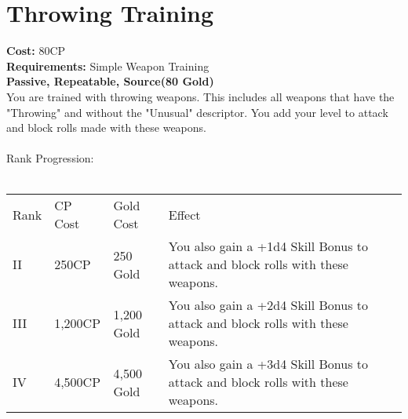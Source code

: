 \section{Throwing Training}\label{perk:throwingTraining}
\textbf{Cost:} 80CP\\
\textbf{Requirements:} Simple Weapon Training\\
\textbf{Passive, Repeatable, Source(80 Gold)}\\
You are trained with throwing weapons.
This includes all weapons that have the "Throwing" and without the "Unusual" descriptor.
You add your level to attack and block rolls made with these weapons.\\
\\
Rank Progression:\\
\\
\begin{tabular}{l | l | l | l}
	Rank & CP Cost & Gold Cost & Effect\\
	II & 250CP & 250 Gold & You also gain a +1d4 Skill Bonus to attack and block rolls with these weapons.\\
	III & 1,200CP & 1,200 Gold & You also gain a +2d4 Skill Bonus to attack and block rolls with these weapons.\\
	IV & 4,500CP & 4,500 Gold & You also gain a +3d4 Skill Bonus to attack and block rolls with these weapons.\\
\end{tabular}
